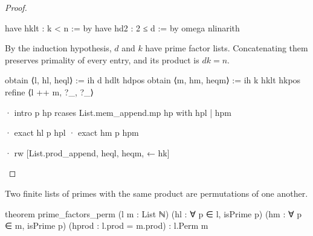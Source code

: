 \begin{proof}
\begin{lean}
    have hklt : k < n := by
      have hd2 : 2 ≤ d := by
        omega
      nlinarith
  \end{lean}

  By the induction hypothesis, $d$ and $k$ have prime factor lists.
  Concatenating them preserves primality of every entry, and its product is $dk=n$.

  \begin{lean}
    obtain ⟨l, hl, heql⟩ := ih d hdlt hdpos
    obtain ⟨m, hm, heqm⟩ := ih k hklt hkpos
    refine ⟨l ++ m, ?_, ?_⟩

    · intro p hp
      rcases List.mem_append.mp hp with hpl | hpm

      · exact hl p hpl
      · exact hm p hpm

    · rw [List.prod_append, heql, heqm, ← hk]
  \end{lean}

\end{proof}

\begin{lemma}
  \label{ent:lem:prime-factor-permutation}
  Two finite lists of primes with the same product are permutations of one another.

  \begin{lean}
    theorem prime_factors_perm (l m : List ℕ) (hl : ∀ p ∈ l, isPrime p)
        (hm : ∀ p ∈ m, isPrime p) (hprod : l.prod = m.prod) : l.Perm m
  \end{lean}
\end{lemma}

